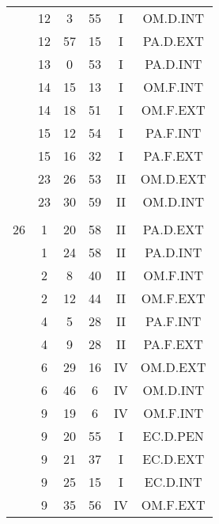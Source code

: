 \documentclass[12pt, a4paper]{article}
\begin{document}
\begin{multicols}{3}
{\begin{tabular}{c c c c c c}
	 	 	 	 & 12 & 3 & 55 & I & OM.D.INT\\%
	 	 	 	 & 12 & 57 & 15 & I & PA.D.EXT\\%
	 	 	 	 & 13 & 0 & 53 & I & PA.D.INT\\%
	 	 	 	 & 14 & 15 & 13 & I & OM.F.INT\\%
	 	 	 	 & 14 & 18 & 51 & I & OM.F.EXT\\%
	 	 	 	 & 15 & 12 & 54 & I & PA.F.INT\\%
	 	 	 	 & 15 & 16 & 32 & I & PA.F.EXT\\%
	 	 	 	 & 23 & 26 & 53 & II & OM.D.EXT\\%
	 	 	 	 & 23 & 30 & 59 & II & OM.D.INT\\%
	 	 	 	 & & & & & \\%
	 	 	 	26 & 1 & 20 & 58 & II & PA.D.EXT\\%
	 	 	 	 & 1 & 24 & 58 & II & PA.D.INT\\%
	 	 	 	 & 2 & 8 & 40 & II & OM.F.INT\\%
	 	 	 	 & 2 & 12 & 44 & II & OM.F.EXT\\%
	 	 	 	 & 4 & 5 & 28 & II & PA.F.INT\\%
	 	 	 	 & 4 & 9 & 28 & II & PA.F.EXT\\%
	 	 	 	 & 6 & 29 & 16 & IV & OM.D.EXT\\%
	 	 	 	 & 6 & 46 & 6 & IV & OM.D.INT\\%
	 	 	 	 & 9 & 19 & 6 & IV & OM.F.INT\\%
	 	 	 	 & 9 & 20 & 55 & I & EC.D.PEN\\%
	 	 	 	 & 9 & 21 & 37 & I & EC.D.EXT\\%
	 	 	 	 & 9 & 25 & 15 & I & EC.D.INT\\%
	 	 	 	 & 9 & 35 & 56 & IV & OM.F.EXT\\%

\end{tabular}}
\end{multicols}
\end{document}
